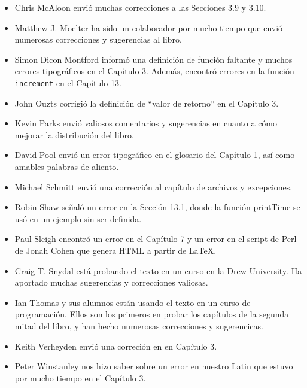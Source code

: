 \documentclass[10pt]{book}
\begin{document}
\begin{itemize}
\item Chris McAloon envió muchas correcciones a las Secciones 3.9 y
3.10.

\item Matthew J. Moelter ha sido un colaborador por mucho tiempo que envió
numerosas correcciones y sugerencias al libro.

\item Simon Dicon Montford informó una definición de función faltante y
muchos errores tipográficos en el Capítulo 3.  Además, encontró errores en la función {\tt increment}
en el Capítulo 13.

\item John Ouzts corrigió la definición de ``valor de retorno''
en el Capítulo 3.

\item Kevin Parks envió valiosos comentarios y sugerencias en cuanto a cómo
mejorar la distribución del libro.

\item David Pool envió un error tipográfico en el glosario del Capítulo 1, así como
amables palabras de aliento.

\item Michael Schmitt envió una corrección al capítulo de archivos
y excepciones.

\item Robin Shaw señaló un error en la Sección 13.1, donde la
función printTime se usó en un ejemplo sin ser definida.

\item Paul Sleigh encontró un error en el Capítulo 7 y un error en el script de Perl
de Jonah Cohen que genera HTML a partir de LaTeX.

\item Craig T. Snydal está probando el texto en un curso en la Drew
University.  Ha aportado muchas sugerencias y correcciones valiosas.

\item Ian Thomas y sus alumnos están usando el texto en un curso de
programación.  Ellos son los primeros en probar los capítulos de la segunda mitad
del libro, y han hecho numerosas correcciones y sugerencicas.

\item Keith Verheyden envió una correción en en Capítulo 3.

\item Peter Winstanley nos hizo saber sobre un error en
nuestro Latin que estuvo por mucho tiempo en el Capítulo 3.


\end{itemize}
\end{document}
